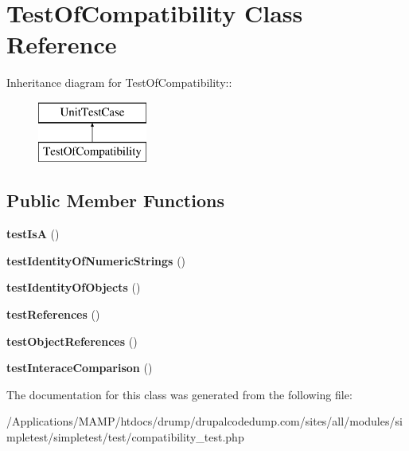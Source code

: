 \hypertarget{class_test_of_compatibility}{
\section{TestOfCompatibility Class Reference}
\label{class_test_of_compatibility}
}
Inheritance diagram for TestOfCompatibility::\begin{figure}[H]
\begin{center}
\leavevmode
\includegraphics[height=2cm]{class_test_of_compatibility}
\end{center}
\end{figure}
\subsection*{Public Member Functions}
\begin{DoxyCompactItemize}
\item 
\hypertarget{class_test_of_compatibility_a6fe441c6eba86c035739b736e472e4d2}{
{\bfseries testIsA} ()}
\label{class_test_of_compatibility_a6fe441c6eba86c035739b736e472e4d2}

\item 
\hypertarget{class_test_of_compatibility_a877430a863576836fb0856a5d9a688d2}{
{\bfseries testIdentityOfNumericStrings} ()}
\label{class_test_of_compatibility_a877430a863576836fb0856a5d9a688d2}

\item 
\hypertarget{class_test_of_compatibility_aab911c39fb3c10e86a785d78dc3c9bc0}{
{\bfseries testIdentityOfObjects} ()}
\label{class_test_of_compatibility_aab911c39fb3c10e86a785d78dc3c9bc0}

\item 
\hypertarget{class_test_of_compatibility_a70ba5481785aceac5efeb310b2ff53ec}{
{\bfseries testReferences} ()}
\label{class_test_of_compatibility_a70ba5481785aceac5efeb310b2ff53ec}

\item 
\hypertarget{class_test_of_compatibility_a17eec2cc736053420841750678c90fa0}{
{\bfseries testObjectReferences} ()}
\label{class_test_of_compatibility_a17eec2cc736053420841750678c90fa0}

\item 
\hypertarget{class_test_of_compatibility_a9f498b525c4772dbc7d77602ef4a4ea2}{
{\bfseries testInteraceComparison} ()}
\label{class_test_of_compatibility_a9f498b525c4772dbc7d77602ef4a4ea2}

\end{DoxyCompactItemize}


The documentation for this class was generated from the following file:\begin{DoxyCompactItemize}
\item 
/Applications/MAMP/htdocs/drump/drupalcodedump.com/sites/all/modules/simpletest/simpletest/test/compatibility\_\-test.php\end{DoxyCompactItemize}

